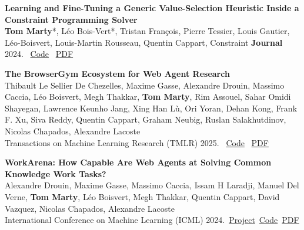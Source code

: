 \documentclass[letterpaper,11pt]{article}
\begin{document}
\begin{tcolorbox}[enhanced, rounded corners, colback=white, colframe=black!10!white, boxrule=0.5mm, left=10pt, right=10pt, top=6pt, bottom=3pt]
    \textbf{Learning and Fine-Tuning a Generic Value-Selection Heuristic Inside a Constraint Programming Solver} \\
    \textbf{Tom Marty}*, Léo Bois-Vert*, Tristan François, Pierre Tessier, Louis Gautier, Léo-Boisvert, Louis-Martin Rousseau, Quentin Cappart, Constraint \textbf{Journal} 2024.
 \hfill \faCode  \, \href{https://github.com/corail-research/SeaPearl.jl}{Code} \quad\faFilePdf \, \href{https://link.springer.com/article/10.1007/s10601-024-09377-4}{PDF}
\end{tcolorbox}

\begin{tcolorbox}[enhanced, rounded corners, colback=white, colframe=black!10!white, boxrule=0.5mm, left=10pt, right=10pt, top=6pt, bottom=3pt]
    \textbf{The BrowserGym Ecosystem for Web Agent Research} \\
    Thibault Le Sellier De Chezelles, Maxime Gasse, Alexandre Drouin, Massimo Caccia, Léo Boisvert, Megh Thakkar, \textbf{Tom Marty}, Rim Assouel, Sahar Omidi Shayegan, Lawrence Keunho Jang, Xing Han Lù, Ori Yoran, Dehan Kong, Frank F. Xu, Siva Reddy, Quentin Cappart, Graham Neubig, Ruslan Salakhutdinov, Nicolas Chapados, Alexandre Lacoste \\
        Transactions on Machine Learning Research (TMLR) 2025. \hfill  \faCode  \, \href{https://github.com/ServiceNow/BrowserGym}{Code} \quad
    \faFilePdf \, \href{https://arxiv.org/abs/2412.05467}{PDF}
\end{tcolorbox}

\begin{tcolorbox}[enhanced, rounded corners, colback=white, colframe=black!10!white, boxrule=0.5mm, left=10pt, right=10pt, top=6pt, bottom=3pt]
    \textbf{WorkArena: How Capable Are Web Agents at Solving Common Knowledge Work Tasks?} \\
    Alexandre Drouin, Maxime Gasse, Massimo Caccia, Issam H Laradji, Manuel Del Verne, \textbf{Tom Marty}, Léo Boisvert, Megh Thakkar, Quentin Cappart, David Vazquez, Nicolas Chapados, Alexandre Lacoste \\
    International Conference on Machine Learning (ICML) 2024.  \hfill
\faLink \,\href{https://servicenow.github.io/WorkArena/}{Project}\quad \faCode\, \href{https://github.com/ServiceNow/WorkArena}{Code}\quad \faFilePdf \, \href{https://openreview.net/forum?id=BRfqYrikdo}{PDF}
\end{tcolorbox}
\end{document}
